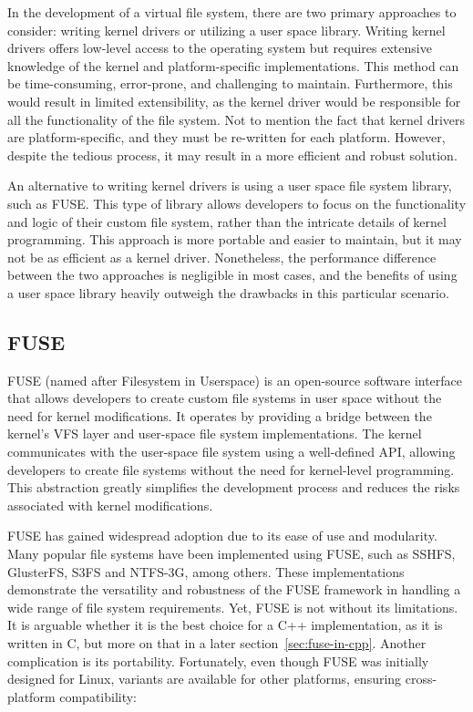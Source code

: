 In the development of a virtual file system, there are two primary approaches to consider: writing kernel drivers or utilizing a user space library.
Writing kernel drivers offers low-level access to the operating system but requires extensive knowledge of the kernel and platform-specific implementations.
This method can be time-consuming, error-prone, and challenging to maintain.
Furthermore, this would result in limited extensibility, as the kernel driver would be responsible for all the functionality of the file system.
Not to mention the fact that kernel drivers are platform-specific, and they must be re-written for each platform.
However, despite the tedious process, it may result in a more efficient and robust solution.

An alternative to writing kernel drivers is using a user space file system library, such as FUSE\@.
This type of library allows developers to focus on the functionality and logic of their custom file system, rather than the intricate details of kernel programming.
This approach is more portable and easier to maintain, but it may not be as efficient as a kernel driver.
Nonetheless, the performance difference between the two approaches is negligible in most cases, and the benefits of using a user space library heavily outweigh the drawbacks in this particular scenario.

\subsection{FUSE}\label{subsec:fuse}

FUSE (named after Filesystem in Userspace) is an open-source software interface that allows developers to create custom file systems in user space without the need for kernel modifications.
It operates by providing a bridge between the kernel's VFS layer and user-space file system implementations.
The kernel communicates with the user-space file system using a well-defined API, allowing developers to create file systems without the need for kernel-level programming.
This abstraction greatly simplifies the development process and reduces the risks associated with kernel modifications.

FUSE has gained widespread adoption due to its ease of use and modularity.
Many popular file systems have been implemented using FUSE, such as SSHFS, GlusterFS, S3FS and NTFS-3G, among others.
These implementations demonstrate the versatility and robustness of the FUSE framework in handling a wide range of file system requirements.
Yet, FUSE is not without its limitations.
It is arguable whether it is the best choice for a C++ implementation, as it is written in C, but more on that in a later section~\ref{sec:fuse-in-cpp}.
Another complication is its portability.
Fortunately, even though FUSE was initially designed for Linux, variants are available for other platforms, ensuring cross-platform compatibility:

